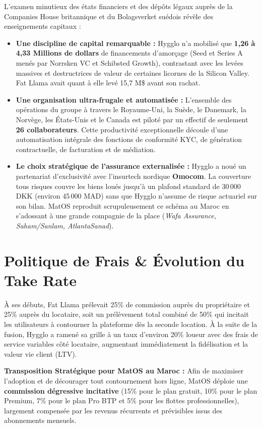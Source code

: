 \documentclass[11pt,a4paper]{report}
\begin{document}
L'examen minutieux des états financiers et des dépôts légaux auprès de la Companies House britannique et du Bolagsverket suédois révèle des enseignements capitaux :
\begin{itemize}[leftmargin=*]
    \item \textbf{Une discipline de capital remarquable :} Hygglo n'a mobilisé que \textbf{1,26 à 4,33 Millions de dollars} de financements d'amorçage (Seed et Series A menés par Norrsken VC et Schibsted Growth), contrastant avec les levées massives et destructrices de valeur de certaines licornes de la Silicon Valley. Fat Llama avait quant à elle levé 15,7 M\$ avant son rachat.
    \item \textbf{Une organisation ultra-frugale et automatisée :} L'ensemble des opérations du groupe à travers le Royaume-Uni, la Suède, le Danemark, la Norvège, les États-Unis et le Canada est piloté par un effectif de seulement \textbf{26 collaborateurs}. Cette productivité exceptionnelle découle d'une automatisation intégrale des fonctions de conformité KYC, de génération contractuelle, de facturation et de médiation.
    \item \textbf{Le choix stratégique de l'assurance externalisée :} Hygglo a noué un partenariat d'exclusivité avec l'insurtech nordique \textbf{Omocom}. La couverture tous risques couvre les biens loués jusqu'à un plafond standard de 30\,000 DKK (environ 45\,000 MAD) sans que Hygglo n'assume de risque actuariel sur son bilan. MatOS reproduit scrupuleusement ce schéma au Maroc en s'adossant à une grande compagnie de la place (\textit{Wafa Assurance, Saham/Sanlam, AtlantaSanad}).
\end{itemize}

\section{Politique de Frais \& Évolution du Take Rate}
À ses débuts, Fat Llama prélevait 25\% de commission auprès du propriétaire et 25\% auprès du locataire, soit un prélèvement total combiné de 50\% qui incitait les utilisateurs à contourner la plateforme dès la seconde location. À la suite de la fusion, Hygglo a ramené sa grille à un taux d'environ 20\% loueur avec des frais de service variables côté locataire, augmentant immédiatement la fidélisation et la valeur vie client (LTV).

\begin{tcolorbox}[techbox]
\textbf{Transposition Stratégique pour MatOS au Maroc :} Afin de maximiser l'adoption et de décourager tout contournement hors ligne, MatOS déploie une \textbf{commission dégressive incitative} (15\% pour le plan gratuit, 10\% pour le plan Premium, 7\% pour le plan Pro BTP et 5\% pour les flottes professionnelles), largement compensée par les revenus récurrents et prévisibles issus des abonnements mensuels.
\end{tcolorbox}
\end{document}
